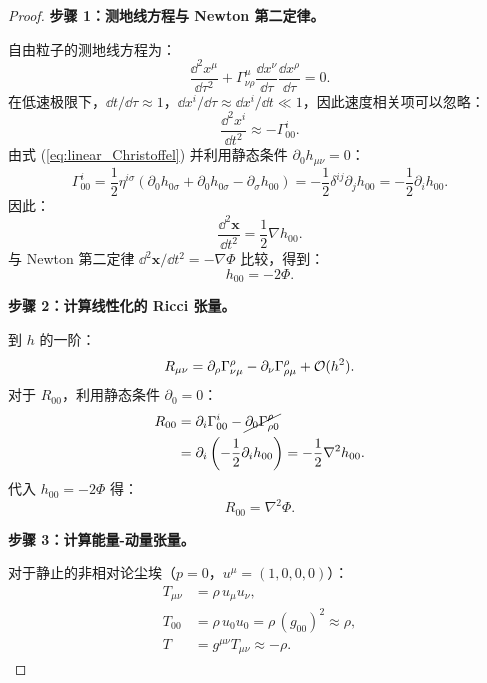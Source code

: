 \begin{proof}
\textbf{步骤 1：测地线方程与 Newton 第二定律。}

自由粒子的测地线方程为：
\begin{equation}
    \frac{\dd^2 x^\mu}{\dd\tau^2} + \Gamma^\mu_{\nu\rho} \frac{\dd x^\nu}{\dd\tau}\frac{\dd x^\rho}{\dd\tau} = 0.
\end{equation}
在低速极限下，$\dd t/\dd\tau \approx 1$，$\dd x^i/\dd\tau \approx \dd x^i/\dd t \ll 1$，因此速度相关项可以忽略：
\begin{equation}
    \frac{\dd^2 x^i}{\dd t^2} \approx -\Gamma^i_{00}.
\end{equation}
由式 (\ref{eq:linear_Christoffel}) 并利用静态条件 $\partial_0 h_{\mu\nu} = 0$：
\begin{equation}
    \Gamma^i_{00} = \frac{1}{2}\eta^{i\sigma}(\partial_0 h_{0\sigma} + \partial_0 h_{0\sigma} - \partial_\sigma h_{00})
    = -\frac{1}{2}\delta^{ij}\partial_j h_{00} = -\frac{1}{2}\partial_i h_{00}.
\end{equation}
因此：
\begin{equation}
    \frac{\dd^2 \mathbf{x}}{\dd t^2} = \frac{1}{2}\nabla h_{00}.
    \label{eq:geodesic_newton}
\end{equation}
与 Newton 第二定律 $\dd^2\mathbf{x}/\dd t^2 = -\nabla\Phi$ 比较，得到：
\begin{equation}
    h_{00} = -2\Phi.
    \label{eq:h00_Phi}
\end{equation}

\textbf{步骤 2：计算线性化的 Ricci 张量。}

到 $h$ 的一阶：
\begin{equation}
    R_{\mu\nu} = \partial_\rho \Gamma^\rho_{\nu\mu} - \partial_\nu \Gamma^\rho_{\rho\mu} + \mathcal{O}(h^2).
\end{equation}
对于 $R_{00}$，利用静态条件 $\partial_0 = 0$：
\begin{align}
    R_{00} &= \partial_i \Gamma^i_{00} - \cancel{\partial_0 \Gamma^\rho_{\rho 0}} \\
           &= \partial_i\left(-\frac{1}{2}\partial_i h_{00}\right)
           = -\frac{1}{2}\nabla^2 h_{00}.
\end{align}
代入 $h_{00} = -2\Phi$ 得：
\begin{equation}
    R_{00} = \nabla^2 \Phi.
    \label{eq:R00_Newton}
\end{equation}

\textbf{步骤 3：计算能量-动量张量。}

对于静止的非相对论尘埃（$p = 0$，$u^\mu = (1, 0, 0, 0)$）：
\begin{align}
    T_{\mu\nu} &= \rho \, u_\mu u_\nu, \\
    T_{00} &= \rho \, u_0 u_0 = \rho \, (g_{00})^2 \approx \rho, \\
    T &= g^{\mu\nu} T_{\mu\nu} \approx -\rho.
\end{align}


\end{proof}
